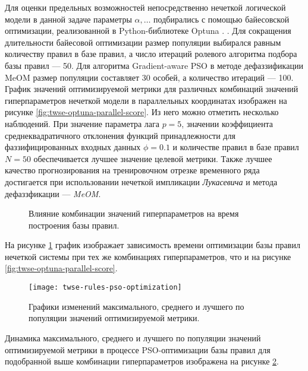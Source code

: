 Для оценки предельных возможностей непосредственно нечеткой логической модели в данной задаче параметры $\alpha,\dots$ подбирались с помощью байесовской оптимизации, реализованной в Python-библиотеке Optuna \cite{Optuna2024, akiba2019optuna}. . Для сокращения длительности байесовой оптимизации размер популяции выбирался равным количеству правил в базе правил, а число итераций ролевого алгоритма подбора базы правил --- 50. Для алгоритма Gradient-aware PSO в методе дефаззификации MeOM размер популяции составляет 30 особей, а количество итераций --- 100. График значений оптимизируемой метрики для различных комбинаций значений гиперпараметров нечеткой модели в параллельных координатах изображен на рисунке \cref{fig:twse-optuna-parallel-score}. Из него можно отметить несколько наблюдений. При значение параметра лага $p = 5$, значении коэффициента среднеквадратичного отклонения функций принадлежности для фаззифицированных входных данных $\phi = 0.1$ и количестве правил в базе правил $N = 50$ обеспечивается лучшее значение целевой метрики. Также лучшее качество прогнозирования на тренировочном отрезке временного ряда достигается при использовании нечеткой импликации \textit{Лукасевича} и метода дефаззфикации --- \textit{MeOM}.

\begin{figure}[hbt] 	
	\label{fig:twse-optuna-parallel-duration}
	\centering
	\caption{Влияние комбинации значений гиперпараметров на время построения базы правил.}
\end{figure}

На рисунке \cref{fig:twse-optuna-parallel-duration} график изображает зависимость времени оптимизации базы правил нечеткой системы при тех же комбинациях гиперпараметров, что и на рисунке \cref{fig:twse-optuna-parallel-score}.

\begin{figure}[hbt] 	
	\label{fig:twse-rules-pso-optimization}
	\centering
	\texttt{[image: twse-rules-pso-optimization]}
	\caption{Графики изменений максимального, среднего и лучшего по популяции значений оптимизируемой метрики.}
\end{figure}

Динамика максимального, среднего и лучшего по популяции значений оптимизируемой метрики в процессе PSO-оптимизации базы правил для подобранной выше комбинации гиперпараметров изображена на рисунке \cref{fig:twse-rules-pso-optimization}.

